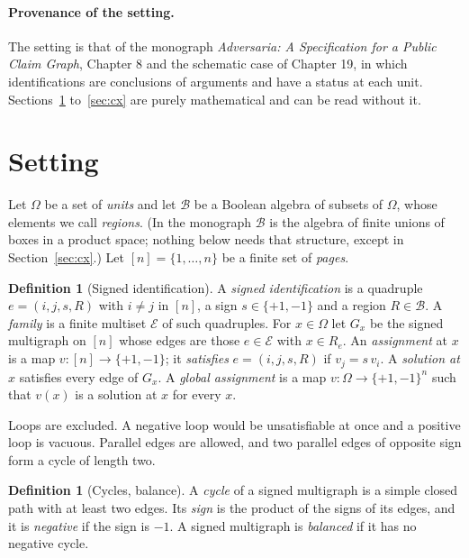 \documentclass[11pt]{article}
\theoremstyle{plain}
\theoremstyle{definition}
\newtheorem{definition}[theorem]{Definition}
\theoremstyle{remark}
\newcommand{\Om}{\Omega}
\begin{document}
\paragraph{Provenance of the setting.} The setting is that of the monograph \emph{Adversaria: A Specification for a Public Claim Graph}, Chapter 8 and the schematic case of Chapter 19, in which identifications are conclusions of arguments and have a status at each unit. Sections~\ref{sec:setting} to~\ref{sec:cx} are purely mathematical and can be read without it.

\section{Setting}\label{sec:setting}

Let $\Om$ be a set of \emph{units} and let $\mathcal B$ be a Boolean algebra of subsets of $\Om$, whose elements we call \emph{regions}. (In the monograph $\mathcal B$ is the algebra of finite unions of boxes in a product space; nothing below needs that structure, except in Section~\ref{sec:cx}.) Let $[n]=\{1,\dots,n\}$ be a finite set of \emph{pages}.

\begin{definition}[Signed identification]\label{def:edge}
A \emph{signed identification} is a quadruple $e=(i,j,s,R)$ with $i\ne j$ in $[n]$, a sign $s\in\{+1,-1\}$ and a region $R\in\mathcal B$. A \emph{family} is a finite multiset $\mathcal E$ of such quadruples. For $x\in\Om$ let $G_x$ be the signed multigraph on $[n]$ whose edges are those $e\in\mathcal E$ with $x\in R_e$. An \emph{assignment} at $x$ is a map $v:[n]\to\{+1,-1\}$; it \emph{satisfies} $e=(i,j,s,R)$ if $v_j=s\,v_i$. A \emph{solution at $x$} satisfies every edge of $G_x$. A \emph{global assignment} is a map $v:\Om\to\{+1,-1\}^n$ such that $v(x)$ is a solution at $x$ for every $x$.
\end{definition}

Loops are excluded. A negative loop would be unsatisfiable at once and a positive loop is vacuous. Parallel edges are allowed, and two parallel edges of opposite sign form a cycle of length two.

\begin{definition}[Cycles, balance]
A \emph{cycle} of a signed multigraph is a simple closed path with at least two edges. Its \emph{sign} is the product of the signs of its edges, and it is \emph{negative} if the sign is $-1$. A signed multigraph is \emph{balanced} if it has no negative cycle.
\end{definition}
\end{document}
